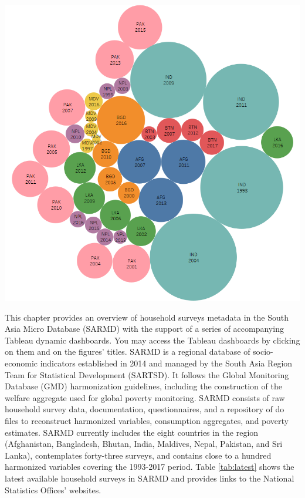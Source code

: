 \documentclass[13 pt,]{book}
\begin{document}
\href{https://tab.worldbank.org/\#/site/WBG/views/SAR_MNA_Summary/Cover}{\includegraphics{figures/Bubbles.png}}

This chapter provides an overview of household surveys metadata in the
South Asia Micro Database (SARMD) with the support of a series of
accompanying Tableau dynamic dashboards. You may access the Tableau
dashboards by clicking on them and on the figures' titles. SARMD is a
regional database of socio-economic indicators established in 2014 and
managed by the South Asia Region Team for Statistical Development
(SARTSD). It follows the Global Monitoring Database (GMD) harmonization
guidelines, including the construction of the welfare aggregate used for
global poverty monitoring. SARMD consists of raw household survey data,
documentation, questionnaires, and a repository of do files to
reconstruct harmonized variables, consumption aggregates, and poverty
estimates. SARMD currently includes the eight countries in the region
(Afghanistan, Bangladesh, Bhutan, India, Maldives, Nepal, Pakistan, and
Sri Lanka), contemplates forty-three surveys, and contains close to a
hundred harmonized variables covering the 1993-2017 period. Table
\ref{tab:latest} shows the latest available household surveys in SARMD
and provides links to the National Statistics Offices' websites.
\end{document}
